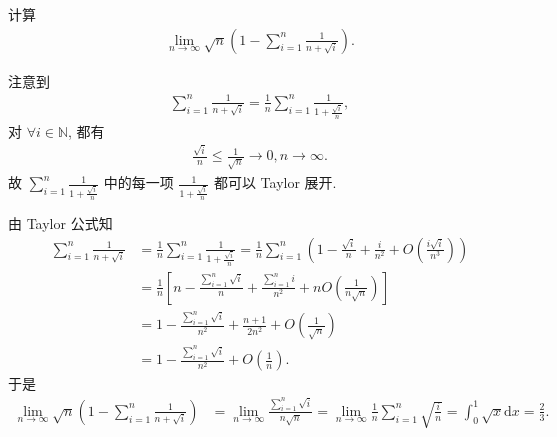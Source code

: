 \documentclass[../../main.tex]{subfiles}%
\begin{document}
\begin{example}
计算
\begin{align*}
\lim_{n \to \infty} \sqrt{n} \left( 1 - \sum_{i=1}^n \frac{1}{n + \sqrt{i}} \right).
\end{align*}
\end{example}
\begin{note}
注意到
\begin{align*}
\sum_{i=1}^n \frac{1}{n + \sqrt{i}} = \frac{1}{n} \sum_{i=1}^n \frac{1}{1 + \frac{\sqrt{i}}{n}},
\end{align*}
对 $\forall i \in \mathbb{N}$, 都有
\begin{align*}
\frac{\sqrt{i}}{n} \leqslant \frac{1}{\sqrt{n}} \rightarrow 0, n \rightarrow \infty.
\end{align*}
故 $\sum_{i=1}^n \frac{1}{1 + \frac{\sqrt{i}}{n}}$ 中的每一项 $\frac{1}{1 + \frac{\sqrt{i}}{n}}$ 都可以 Taylor 展开.
\end{note}
\begin{solution}

由 Taylor 公式知
\begin{align*}
\sum_{i=1}^n \frac{1}{n + \sqrt{i}} &= \frac{1}{n} \sum_{i=1}^n \frac{1}{1 + \frac{\sqrt{i}}{n}} = \frac{1}{n} \sum_{i=1}^n \left( 1 - \frac{\sqrt{i}}{n} + \frac{i}{n^2} + O\left( \frac{i\sqrt{i}}{n^3} \right) \right) \\
&= \frac{1}{n} \left[ n - \frac{\sum\limits_{i=1}^n \sqrt{i}}{n} + \frac{\sum\limits_{i=1}^n i}{n^2} + nO\left( \frac{1}{n\sqrt{n}} \right) \right] \\
&= 1 - \frac{\sum\limits_{i=1}^n \sqrt{i}}{n^2} + \frac{n + 1}{2n^2} + O\left( \frac{1}{\sqrt{n}} \right) \\
&= 1 - \frac{\sum\limits_{i=1}^n \sqrt{i}}{n^2} + O\left( \frac{1}{n} \right).
\end{align*}
于是
\begin{align*}
\lim_{n \rightarrow \infty} \sqrt{n} \left( 1 - \sum_{i=1}^n \frac{1}{n + \sqrt{i}} \right) &= \lim_{n \rightarrow \infty} \frac{\sum\limits_{i=1}^n \sqrt{i}}{n\sqrt{n}} = \lim_{n \rightarrow \infty} \frac{1}{n} \sum\limits_{i=1}^n \sqrt{\frac{i}{n}} = \int_0^1 \sqrt{x} \mathrm{d}x = \frac{2}{3}.
\end{align*}

\end{solution}
\end{document}
